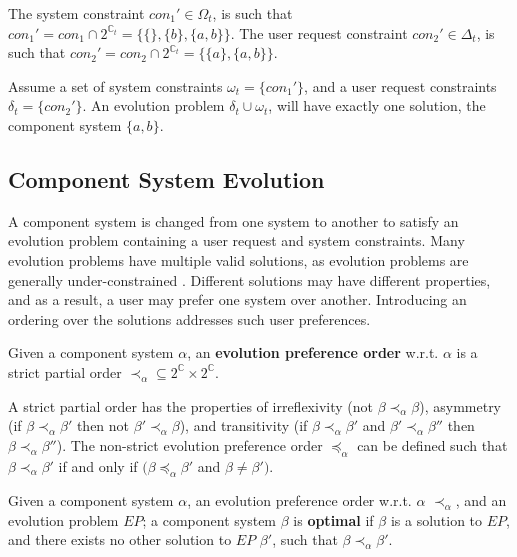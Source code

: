 The system constraint $con_1' \in \Omega_{t}$, is such that $con_1' = con_1 \cap 2^{\mathbb{C}_{t}} = \{\{\},\{b\},\{a,b\}\}$.
The user request constraint $con_2' \in \Delta_{t}$, is such that $con_2' = con_2 \cap 2^{\mathbb{C}_{t}} = \{\{a\},\{a,b\}\}$.

Assume a set of system constraints $\omega_{t} = \{con_1'\}$, and a user request constraints $\delta_{t} = \{con_2'\}$.
An evolution problem $\delta_{t} \cup \omega_{t}$, will have exactly one solution, the component system $\{a,b\}$.  

\subsection{Component System Evolution}
\label{formal.evo}
A component system is changed from one system to another to satisfy an evolution problem containing a user request and system constraints.
Many evolution problems have multiple valid solutions, as evolution problems are generally under-constrained \citep{Berre2008}.
Different solutions may have different properties,
and as a result, a user may prefer one system over another.
Introducing an ordering over the solutions addresses such user preferences.  

\begin{defs}
Given a component system $\alpha$, an \textbf{evolution preference order} w.r.t. $\alpha$ is a strict partial order $\prec_{\alpha} \subseteq 2^{\mathbb{C}} \times 2^{\mathbb{C}}$.
\end{defs}
A strict partial order has the properties of irreflexivity (not $\beta \prec_{\alpha} \beta$), asymmetry (if $\beta \prec_{\alpha} \beta'$ then not $\beta' \prec_{\alpha} \beta$), 
and transitivity (if $\beta \prec_{\alpha} \beta'$ and $\beta' \prec_{\alpha} \beta''$ then $\beta \prec_{\alpha} \beta''$).
The non-strict evolution preference order $\preceq_{\alpha}$ can be defined such that $\beta \prec_{\alpha} \beta'$ if and only if $(\beta \preceq_{\alpha} \beta'$ and $\beta \neq \beta')$. 

\begin{defs}
Given a component system $\alpha$, an evolution preference order w.r.t. $\alpha$ $\prec_{\alpha}$, and an evolution problem $EP$;
a component system $\beta$ is \textbf{optimal} if $\beta$ is a solution to $EP$, and there exists no other solution to $EP$ $\beta'$, such that $\beta \prec_{\alpha} \beta'$.   
\end{defs}

